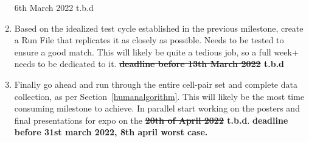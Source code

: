 \documentclass{article}
\begin{document}
\begin{enumerate}
{{            6th March 2022} t.b.d}
          \item Based on the idealized test cycle established in the previous milestone, create a Run File that
            replicates it as closely as possible. Needs to be tested to ensure a good match. This will likely be quite a
            tedious job, so a full week+ needs to be dedicated to it. \textbf{\sout{deadline before 13th March 2022}
            t.b.d}
          \item Finally go ahead and run through the entire cell-pair set and complete data collection, as per
            Section~\ref{humanalgorithm}. This will likely be the most time consuming milestone to achieve. In parallel
            start working on the posters and final presentations for expo on the \textbf{\sout{20th of April 2022}
            t.b.d}.
            \textbf{deadline before 31st march 2022, 8th april worst case.}
        \end{enumerate}
        
  
\end{document}
